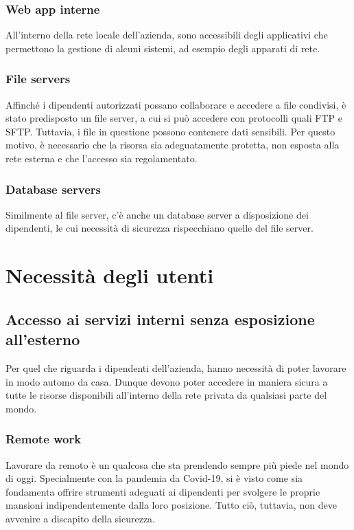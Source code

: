 \subsubsection{Web app interne}
All'interno della rete locale dell'azienda, sono accessibili degli applicativi che permettono la gestione di alcuni sistemi, ad esempio degli apparati di rete.
\subsubsection{File servers}
Affinché i dipendenti autorizzati possano collaborare e accedere a file condivisi, è stato predisposto un file server, a cui si può accedere con protocolli quali FTP \cite[RFC0791]{RFC0959} e SFTP. Tuttavia, i file in questione possono contenere dati sensibili. Per questo motivo, è necessario che la risorsa sia adeguatamente protetta, non esposta alla rete esterna e che l'accesso sia regolamentato.

\subsubsection{Database servers}
Similmente al file server, c'è anche un database server a disposizione dei dipendenti, le cui necessità di sicurezza rispecchiano quelle del file server.

\section{Necessità degli utenti}
\subsection{Accesso ai servizi interni senza esposizione all'esterno}
Per quel che riguarda i dipendenti dell'azienda, hanno necessità di poter lavorare in modo automo da casa. Dunque devono poter accedere in maniera sicura a tutte le risorse disponibili all'interno della rete privata da qualsiasi parte del mondo.
\subsubsection{Remote work}
Lavorare da remoto è un qualcosa che sta prendendo sempre più piede nel mondo di oggi. Specialmente con la pandemia da Covid-19, si è visto come sia fondamenta offrire strumenti adeguati ai dipendenti per svolgere le proprie mansioni indipendentemente dalla loro posizione.
Tutto ciò, tuttavia, non deve avvenire a discapito della sicurezza.

